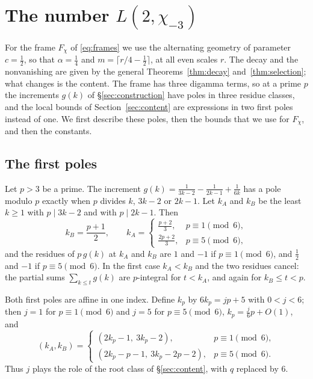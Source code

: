 \section{The number \texorpdfstring{$L(2,\chi_{-3})$}{L(2,chi-3)}}
\label{sec:chi3-quarter}

For the frame $F_\chi$ of \eqref{eq:frames} we use the alternating geometry of parameter $c=\frac12$, so that
$\alpha=\frac14$ and $m=\lceil r/4-\frac12\rceil$, at all even scales $r$. The decay and the nonvanishing are given by the
general Theorems~\ref{thm:decay} and~\ref{thm:selection}; what changes is the content. The frame has three digamma terms,
so at a prime $p$ the increments $g(k)$ of \S\ref{sec:construction} have poles in three residue classes, and the local
bounds of Section~\ref{sec:content} are expressions in two first poles instead of one. We first describe these poles, then
the bounds that we use for $F_\chi$, and then the constants.

\subsection{The first poles}
Let $p>3$ be a prime. The increment $g(k)=\frac1{3k-2}-\frac1{2k-1}+\frac1{6k}$ has a pole modulo $p$ exactly when $p$
divides $k$, $3k-2$ or $2k-1$. Let $k_A$ and $k_B$ be the least $k\ge1$ with $p\mid3k-2$ and with $p\mid2k-1$. Then
\[
 k_B=\frac{p+1}2,\qquad
 k_A=\begin{cases}\frac{p+2}3,&p\equiv1\pmod6,\\[3pt]\frac{2p+2}3,&p\equiv5\pmod6,\end{cases}
\]
and the residues of $p\,g(k)$ at $k_A$ and $k_B$ are $1$ and $-1$ if $p\equiv1\pmod6$, and $\frac12$ and $-1$ if
$p\equiv5\pmod6$. In the first case $k_A<k_B$ and the two residues cancel: the partial sums $\sum_{k\le t}g(k)$ are
$p$-integral for $t<k_A$, and again for $k_B\le t<p$.

Both first poles are affine in one index. Define $k_p$ by $6k_p=jp+5$ with $0<j<6$; then $j=1$ for $p\equiv1\pmod6$
and $j=5$ for $p\equiv5\pmod6$, $k_p=\frac j6p+O(1)$, and
\[
 (k_A,k_B)=\begin{cases}(2k_p-1,\ 3k_p-2),&p\equiv1\pmod6,\\[2pt](2k_p-p-1,\ 3k_p-2p-2),&p\equiv5\pmod6.\end{cases}
\]
Thus $j$ plays the role of the root class of \S\ref{sec:content}, with $q$ replaced by $6$.

